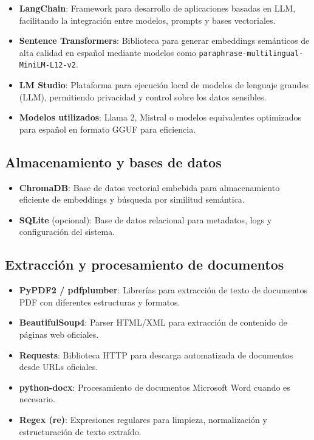 \documentclass[a4paper,12pt]{article}
\begin{document}
\begin{itemize}
    \item \textbf{LangChain}: Framework para desarrollo de aplicaciones basadas en LLM, facilitando la integración entre modelos, prompts y bases vectoriales.
    \item \textbf{Sentence Transformers}: Biblioteca para generar embeddings semánticos de alta calidad en español mediante modelos como \texttt{paraphrase-multilingual-MiniLM-L12-v2}.
    \item \textbf{LM Studio}: Plataforma para ejecución local de modelos de lenguaje grandes (LLM), permitiendo privacidad y control sobre los datos sensibles.
    \item \textbf{Modelos utilizados}: Llama 2, Mistral o modelos equivalentes optimizados para español en formato GGUF para eficiencia.
\end{itemize}

\subsection{Almacenamiento y bases de datos}

\begin{itemize}
    \item \textbf{ChromaDB}: Base de datos vectorial embebida para almacenamiento eficiente de embeddings y búsqueda por similitud semántica.
    \item \textbf{SQLite} (opcional): Base de datos relacional para metadatos, logs y configuración del sistema.
\end{itemize}

\subsection{Extracción y procesamiento de documentos}

\begin{itemize}
    \item \textbf{PyPDF2 / pdfplumber}: Librerías para extracción de texto de documentos PDF con diferentes estructuras y formatos.
    \item \textbf{BeautifulSoup4}: Parser HTML/XML para extracción de contenido de páginas web oficiales.
    \item \textbf{Requests}: Biblioteca HTTP para descarga automatizada de documentos desde URLs oficiales.
    \item \textbf{python-docx}: Procesamiento de documentos Microsoft Word cuando es necesario.
    \item \textbf{Regex (re)}: Expresiones regulares para limpieza, normalización y estructuración de texto extraído.
\end{itemize}
\end{document}
